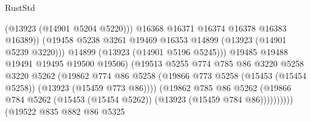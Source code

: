 \begin{lexlean}{RustStd}
\begin{coremodule}
                                              (@13923 (@14901 @5204 @5220)))
                                            @16368
                                            @16371
                                            @16374
                                            @16378
                                            @16383
                                            @16389))
                                        (@19458
                                          @5238
                                          @3261
                                          @19469
                                          @16353
                                          @14899
                                          (@13923 (@14901 @5239 @3220)))
                                        @14899
                                        (@13923 (@14901 @5196 @5245)))
                                      @19485
                                      @19488
                                      @19491
                                      @19495
                                      @19500
                                      @19506)
                                    (@19513
                                      @5255
                                      @774
                                      @785
                                      @86
                                      @3220
                                      @5258
                                      @3220
                                      @5262
                                      (@19862
                                        @774
                                        @86
                                        @5258
                                        (@19866
                                          @773
                                          @5258
                                          (@15453 (@15454 @5258))
                                          (@13923 (@15459 @773 @86))))
                                      (@19862
                                        @785
                                        @86
                                        @5262
                                        (@19866
                                          @784
                                          @5262
                                          (@15453 (@15454 @5262))
                                          (@13923 (@15459 @784 @86))))))))))
                          (@19522
                            @835
                            @882
                            @86
                            @5325

\end{coremodule}
\end{lexlean}
